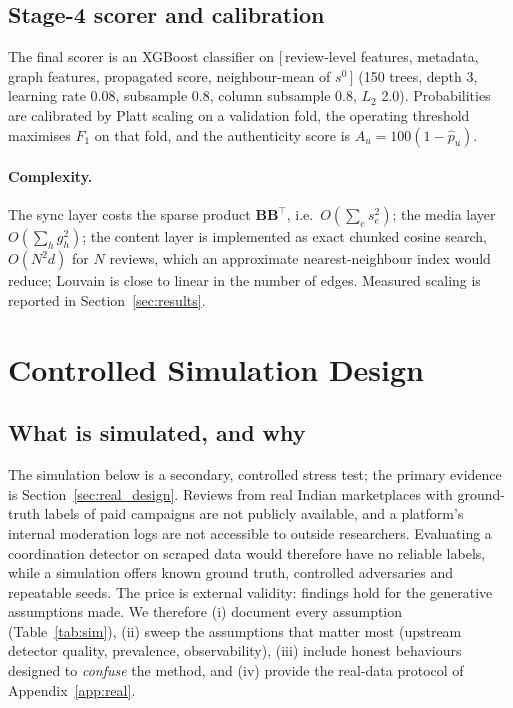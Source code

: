 \documentclass[pdflatex,sn-basic]{sn-jnl}
\theoremstyle{thmstyleone}
\theoremstyle{thmstylethree}
\begin{document}
\subsection{Stage-4 scorer and calibration}
The final scorer is an XGBoost classifier \citep{chen2016} on $[\,$review-level features, metadata, graph features, propagated score, neighbour-mean of $s^0\,]$ (150 trees, depth 3, learning rate 0.08, subsample 0.8, column subsample 0.8, $L_2$ 2.0). Probabilities are calibrated by Platt scaling \citep{platt1999} on a validation fold, the operating threshold maximises $F_1$ on that fold, and the authenticity score is $A_u=100(1-\hat p_u)$.

\paragraph{Complexity.} The sync layer costs the sparse product $\mathbf B\mathbf B^{\top}$, i.e.\ $O(\sum_es_e^2)$; the media layer $O(\sum_hg_h^2)$; the content layer is implemented as exact chunked cosine search, $O(N^2d)$ for $N$ reviews, which an approximate nearest-neighbour index would reduce; Louvain is close to linear in the number of edges. Measured scaling is reported in Section~\ref{sec:results}.

\section{Controlled Simulation Design}\label{sec:design}

\subsection{What is simulated, and why}\label{sec:why}
The simulation below is a secondary, controlled stress test; the primary evidence is Section~\ref{sec:real_design}. 
Reviews from real Indian marketplaces with ground-truth labels of paid campaigns are not publicly available, and a platform's internal moderation logs are not accessible to outside researchers. Evaluating a coordination detector on scraped data would therefore have no reliable labels, while a simulation offers known ground truth, controlled adversaries and repeatable seeds. The price is external validity: findings hold for the generative assumptions made. We therefore (i) document every assumption (Table~\ref{tab:sim}), (ii) sweep the assumptions that matter most (upstream detector quality, prevalence, observability), (iii) include honest behaviours designed to \emph{confuse} the method, and (iv) provide the real-data protocol of Appendix~\ref{app:real}.
\end{document}
